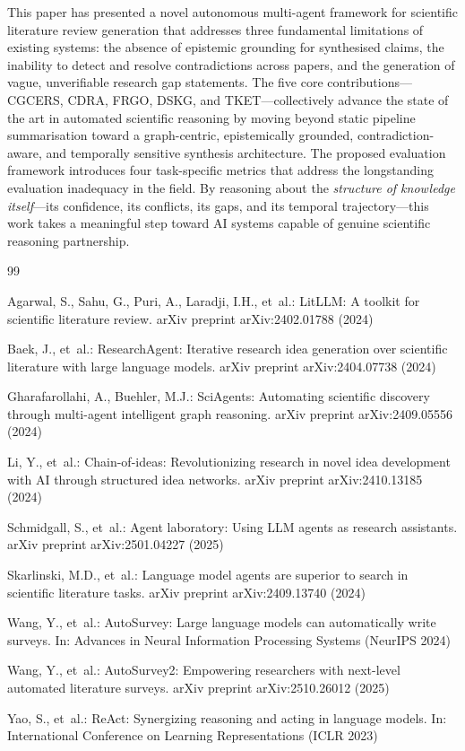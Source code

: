 \documentclass{llncs}
\begin{document}
This paper has presented a novel autonomous multi-agent framework for scientific
literature review generation that addresses three fundamental limitations of
existing systems: the absence of epistemic grounding for synthesised claims,
the inability to detect and resolve contradictions across papers, and the
generation of vague, unverifiable research gap statements. The five core
contributions—CGCERS, CDRA, FRGO, DSKG, and TKET—collectively advance the
state of the art in automated scientific reasoning by moving beyond static
pipeline summarisation toward a graph-centric, epistemically grounded,
contradiction-aware, and temporally sensitive synthesis architecture. The
proposed evaluation framework introduces four task-specific metrics that address
the longstanding evaluation inadequacy in the field. By reasoning about the
\textit{structure of knowledge itself}—its confidence, its conflicts, its
gaps, and its temporal trajectory—this work takes a meaningful step toward AI
systems capable of genuine scientific reasoning partnership.

\begin{thebibliography}{99}

Agarwal, S., Sahu, G., Puri, A., Laradji, I.H., et~al.:
{LitLLM}: A toolkit for scientific literature review.
arXiv preprint arXiv:2402.01788 (2024)

Baek, J., et~al.:
{ResearchAgent}: Iterative research idea generation over scientific literature
with large language models.
arXiv preprint arXiv:2404.07738 (2024)

Gharafarollahi, A., Buehler, M.J.:
{SciAgents}: Automating scientific discovery through multi-agent intelligent
graph reasoning.
arXiv preprint arXiv:2409.05556 (2024)

Li, Y., et~al.:
Chain-of-ideas: Revolutionizing research in novel idea development with
{AI} through structured idea networks.
arXiv preprint arXiv:2410.13185 (2024)

Schmidgall, S., et~al.:
Agent laboratory: Using {LLM} agents as research assistants.
arXiv preprint arXiv:2501.04227 (2025)

Skarlinski, M.D., et~al.:
Language model agents are superior to search in scientific literature tasks.
arXiv preprint arXiv:2409.13740 (2024)

Wang, Y., et~al.:
{AutoSurvey}: Large language models can automatically write surveys.
In: Advances in Neural Information Processing Systems (NeurIPS 2024)

Wang, Y., et~al.:
{AutoSurvey2}: Empowering researchers with next-level automated literature
surveys.
arXiv preprint arXiv:2510.26012 (2025)

Yao, S., et~al.:
{ReAct}: Synergizing reasoning and acting in language models.
In: International Conference on Learning Representations (ICLR 2023)

\end{thebibliography}
\end{document}
